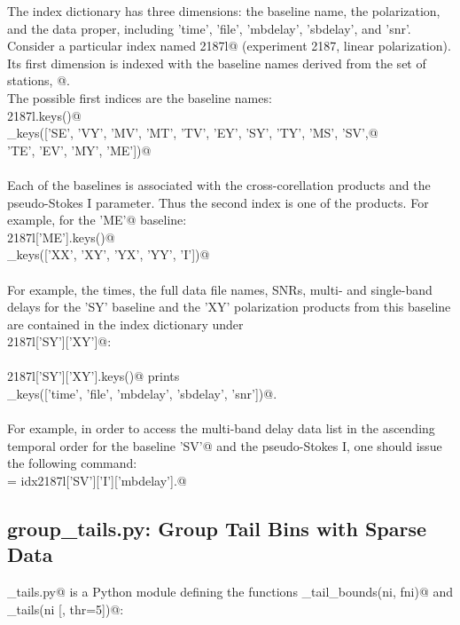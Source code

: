 \documentclass[letterpaper,twoside,12pt]{article}
\begin{document}
The index dictionary has three dimensions: the baseline name, the polarization, and the data proper, including 'time', 'file', 'mbdelay', 'sbdelay', and 'snr'. Consider a particular index named \verb@idx2187l@ (experiment 2187, linear polarization). Its first dimension is indexed with the baseline names derived from the set of stations, @. \\
\noindent The possible first indices are the baseline names: \\
\verb@idx2187l.keys()@ \\
\verb@dict_keys(['SE', 'VY', 'MV', 'MT', 'TV', 'EY', 'SY', 'TY', 'MS', 'SV',@ \\
\verb@           'TE', 'EV', 'MY', 'ME'])@ \\ \\
\noindent Each of the baselines is associated with the cross-corellation products and the pseudo-Stokes I parameter. Thus the second index is one of the products. For example, for the \verb@'ME'@ baseline: \\
\verb@idx2187l['ME'].keys()@ \\
\verb@dict_keys(['XX', 'XY', 'YX', 'YY', 'I'])@ \\ \\
For example, the times, the full data file names, SNRs, multi- and single-band delays for the 'SY' baseline and the 'XY' polarization products from this baseline are contained in the index dictionary under \\
\verb@idx2187l['SY']['XY']@: \\ \\
\verb@idx2187l['SY']['XY'].keys()@ prints \\
\verb@dict_keys(['time', 'file', 'mbdelay', 'sbdelay', 'snr'])@. \\ \\
For example, in order to access the multi-band delay data list in the ascending temporal order for the baseline \verb@'SV'@ and the pseudo-Stokes I, one should issue the following command: \\
\verb@mbd = idx2187l['SV']['I']['mbdelay'].@

\subsection{group\_tails.py: Group Tail Bins with Sparse Data}

\verb@group_tails.py@ is a Python module defining the functions \verb@find_tail_bounds(ni, fni)@ and \verb@group_tails(ni [, thr=5])@: \\
\end{document}
